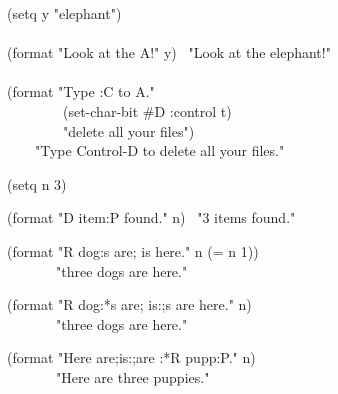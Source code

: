 \begin{lisp}
(setq y "elephant") \\
 \\
(format {\false} "Look at the {\Xtilde}A!" y) \EV\ "Look at the elephant!" \\
 \\
(format {\false} "Type {\Xtilde}:C to {\Xtilde}A." \\
~~~~~~~~(set-char-bit \#{\Xbackslash}D :control t) \\
~~~~~~~~"delete all your files") \\
~~~\EV\ "Type Control-D to delete all your files."
\end{lisp}

\newpage%

\begin{lisp}
(setq n 3)
\end{lisp}
\begin{lisp}
(format {\false} "{\Xtilde}D item{\Xtilde}:P found." n) \EV\ "3 items found."
\end{lisp}
\begin{lisp}
(format {\false} "{\Xtilde}R dog{\Xtilde}:{\Xlbracket}s are{\Xtilde}; is{\Xtilde}{\Xrbracket} here." n (= n 1)) \\
~~~~~~\EV\ "three dogs are here."
\end{lisp}
\begin{lisp}
(format {\false} "{\Xtilde}R dog{\Xtilde}:*{\Xtilde}{\Xlbracket}s are{\Xtilde}; is{\Xtilde}:;s are{\Xtilde}{\Xrbracket} here." n) \\
~~~~~~\EV\ "three dogs are here."
\end{lisp}
\begin{lisp}
(format {\false} "Here {\Xtilde}{\Xlbracket}are{\Xtilde};is{\Xtilde}:;are{\Xtilde}{\Xrbracket} {\Xtilde}:*{\Xtilde}R pupp{\Xtilde}:{\Xatsign}P." n) \\
~~~~~~\EV\ "Here are three puppies."
\end{lisp}

